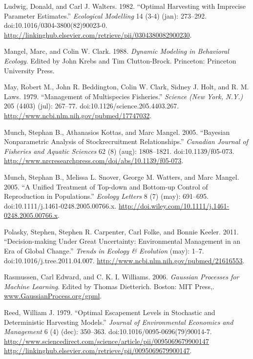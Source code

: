 \documentclass[author-year, review]{elsarticle} %
\begin{document}
Ludwig, Donald, and Carl J. Walters. 1982. ``Optimal Harvesting with
Imprecise Parameter Estimates.'' \emph{Ecological Modelling} 14 (3-4)
(jan): 273--292. doi:10.1016/0304-3800(82)90023-0.
\url{http://linkinghub.elsevier.com/retrieve/pii/0304380082900230}.

Mangel, Marc, and Colin W. Clark. 1988. \emph{Dynamic Modeling in
Behavioral Ecology}. Edited by John Krebs and Tim Clutton-Brock.
Princeton: Princeton University Press.

May, Robert M., John R. Beddington, Colin W. Clark, Sidney J. Holt, and
R. M. Laws. 1979. ``Management of Multispecies Fisheries.''
\emph{Science (New York, N.Y.)} 205 (4403) (jul): 267--77.
doi:10.1126/science.205.4403.267.
\url{http://www.ncbi.nlm.nih.gov/pubmed/17747032}.

Munch, Stephan B., Athanasios Kottas, and Marc Mangel. 2005. ``Bayesian
Nonparametric Analysis of Stockrecruitment Relationships.''
\emph{Canadian Journal of Fisheries and Aquatic Sciences} 62 (8) (aug):
1808--1821. doi:10.1139/f05-073.
\url{http://www.nrcresearchpress.com/doi/abs/10.1139/f05-073}.

Munch, Stephan B., Melissa L. Snover, George M. Watters, and Marc
Mangel. 2005. ``A Unified Treatment of Top-down and Bottom-up Control of
Reproduction in Populations.'' \emph{Ecology Letters} 8 (7) (may):
691--695. doi:10.1111/j.1461-0248.2005.00766.x.
\url{http://doi.wiley.com/10.1111/j.1461-0248.2005.00766.x}.

Polasky, Stephen, Stephen R. Carpenter, Carl Folke, and Bonnie Keeler.
2011. ``Decision-making Under Great Uncertainty: Environmental
Management in an Era of Global Change.'' \emph{Trends in Ecology \&
Evolution} (may): 1--7. doi:10.1016/j.tree.2011.04.007.
\url{http://www.ncbi.nlm.nih.gov/pubmed/21616553}.

Rasmussen, Carl Edward, and C. K. I. Williams. 2006. \emph{Gaussian
Processes for Machine Learning}. Edited by Thomas Dietterich. Boston:
MIT Press,. \url{www.GaussianProcess.org/gpml}.

Reed, William J. 1979. ``Optimal Escapement Levels in Stochastic and
Deterministic Harvesting Models.'' \emph{Journal of Environmental
Economics and Management} 6 (4) (dec): 350--363.
doi:10.1016/0095-0696(79)90014-7.
\href{http://www.sciencedirect.com/science/article/pii/0095069679900147 http://linkinghub.elsevier.com/retrieve/pii/0095069679900147}{http://www.sciencedirect.com/science/article/pii/0095069679900147
http://linkinghub.elsevier.com/retrieve/pii/0095069679900147}.
\end{document}
